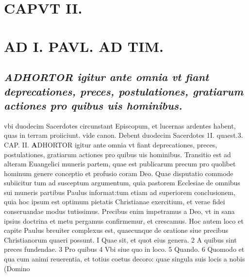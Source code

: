 \documentclass{article}
\begin{document}
\begin{pages}
\section{CAPVT  II. }
\beginnumbering 
\section*{AD I. PAVL. AD TIM. }
\marginpar{[ p.38 ]}\pstart {}
{}
\subsection*{\textit{ADHORTOR igitur ante omnia vt fiant deprecationes, preces, postulationes, gratiarum actiones pro quibus uis hominibus.}}vbi duodecim Sacerdotes circunstant Episcopum, et lucernas ardentes habent, quas in terram proiiciunt. vide canon. Debent duodecim Sacerdotes 1I. quaest.3. CAP. II.
\textbf{A}DHORTOR igitur ante omnia vt fiant deprecationes, preces, postulationes, gratiarum actiones pro quibus uis hominibus. Transitio est ad alteram Euangelici muneris partem, quae est publicarum precum pro quolibet hominum genere conceptio et profusio coram Deo. Quae disputatio commode subiicitur tum ad susceptum argumentum, quia pastorem Ecclesiae de omnibus sui muneris partibus Paulus informat:tum etiam ad superiorem conclusionem, quia hoc ipsum est optimum pietatis Christianae exercitium, et verae fidei conseruandae modus tutissimus. Precibus enim impetramus a Deo, vt in sana ipsius doctrina et metu pergamus confirmemur, et crescamus. Hoc autem loco et capite Paulus breuiter complexus est, quaecunque de oratione siue precibus Christianorum quaeri possunt. I Quae sit, et quot eius genera. 2 A quibus sint preces fundendae. 3 Pro quibus 4 Vbi siue quo in loco. 5 Quando. 6 Quomodo et qua cum animi reuerentia, et totius coetus decoro: quae singula suis locis a nobis (Domino  \pend

\end{pages}
\end{document}
